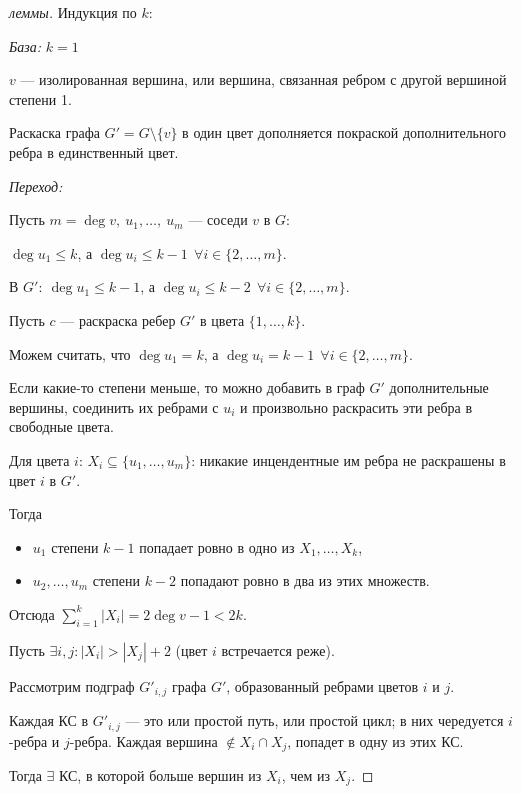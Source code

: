 \begin{proof}[ леммы]

    Индукция по $k$:

    \textsl{База:} $k = 1$

    $v$ --- изолированная вершина, или вершина, связанная ребром с другой вершиной степени 1.

    Раскаска графа $G' = G \setminus \{v\}$ в один цвет дополняется покраской дополнительного ребра в единственный цвет.

    \textsl{Переход:}

    Пусть $m = \deg v,~u_1, \ldots,~u_m$ --- соседи $v$ в $G$:

    $\deg u_1 \leq k$, а $\deg u_i \leq k - 1~~\forall i \in \{2, \ldots, m\}$.

    В $G':~\deg u_1 \leq k - 1$, а $\deg u_i \leq k - 2~~\forall i \in \{2, \ldots, m\}$.

    Пусть $c$ --- раскраска ребер $G'$ в цвета $\{1, \ldots, k\}$.

    Можем считать, что $\deg u_1 = k$, а $\deg u_i = k - 1~~\forall i \in \{2, \ldots, m\}$.

    Если какие-то степени меньше, то можно добавить в граф $G'$ дополнительные вершины, соединить их ребрами с $u_i$ и произвольно раскрасить эти ребра в свободные цвета.

    Для цвета $i$:
    $X_i \subseteq \{u_1, \ldots, u_m\}$: никакие инцендентные им ребра не раскрашены в цвет $i$ в $G'$.

    Тогда 
    \begin{itemize}
        \item $u_1$ степени $k - 1$ попадает ровно в одно из $X_1, \ldots, X_k$,
        \item $u_2,\ldots,u_m$ степени $k - 2$ попадают ровно в два из этих множеств.
    \end{itemize}

    Отсюда $\sum\limits_{i=1}^k |X_i| = 2 \deg v - 1 < 2k$.

    Пусть $\exists i,j: |X_i| > |X_j| + 2$ (цвет $i$ встречается реже).

    Рассмотрим подграф $G'_{i,j}$ графа $G'$, образованный ребрами цветов $i$ и $j$.

    Каждая КС в $G'_{i,j}$ --- это или простой путь, или простой цикл; в них чередуется $i$-ребра и $j$-ребра. Каждая вершина $\notin X_i \cap X_j$, попадет в одну из этих КС.

    Тогда $\exists$ КС, в которой больше вершин из $X_i$, чем из $X_j$.


\end{proof}
